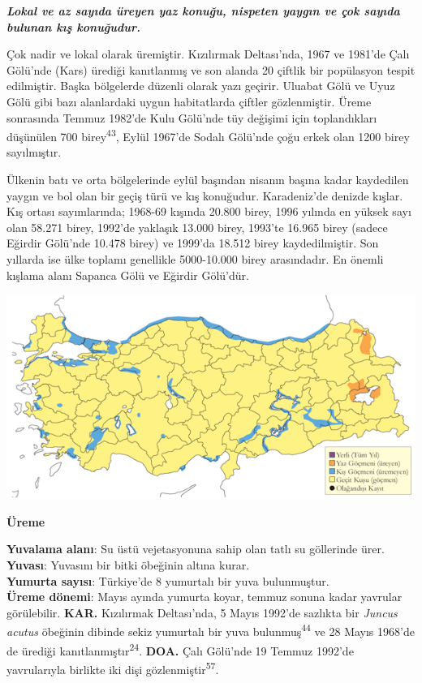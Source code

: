 \documentclass[
  letterpaper,
  DIV=11,
  numbers=noendperiod]{scrreprt}
\begin{document}
\textbf{\emph{Lokal ve az sayıda üreyen yaz konuğu, nispeten yaygın ve
çok sayıda bulunan kış konuğudur.}}

Çok nadir ve lokal olarak üremiştir. Kızılırmak Deltası'nda, 1967 ve
1981'de Çalı Gölü'nde (Kars) ürediği kanıtlanmış ve son alanda 20
çiftlik bir popülasyon tespit edilmiştir. Başka bölgelerde düzenli
olarak yazı geçirir. Uluabat Gölü ve Uyuz Gölü gibi bazı alanlardaki
uygun habitatlarda çiftler gözlenmiştir. Üreme sonrasında Temmuz 1982'de
Kulu Gölü'nde tüy değişimi için toplandıkları düşünülen 700
birey\textsuperscript{43}, Eylül 1967'de Sodalı Gölü'nde çoğu erkek olan
1200 birey sayılmıştır.

Ülkenin batı ve orta bölgelerinde eylül başından nisanın başına kadar
kaydedilen yaygın ve bol olan bir geçiş türü ve kış konuğudur.
Karadeniz'de denizde kışlar. Kış ortası sayımlarında; 1968-69 kışında
20.800 birey, 1996 yılında en yüksek sayı olan 58.271 birey, 1992'de
yaklaşık 13.000 birey, 1993'te 16.965 birey (sadece Eğirdir Gölü'nde
10.478 birey) ve 1999'da 18.512 birey kaydedilmiştir. Son yıllarda ise
ülke toplamı genellikle 5000-10.000 birey arasındadır. En önemli kışlama
alanı Sapanca Gölü ve Eğirdir Gölü'dür.

\includegraphics{images/harita_Page_025.png}

\textbf{Üreme}

\textbf{Yuvalama alanı}: Su üstü vejetasyonuna sahip olan tatlı su
göllerinde ürer.\\
\textbf{Yuvası}: Yuvasını bir bitki öbeğinin altına kurar.\\
\textbf{Yumurta sayısı}: Türkiye'de 8 yumurtalı bir yuva bulunmuştur.\\
\textbf{Üreme dönemi}: Mayıs ayında yumurta koyar, temmuz sonuna kadar
yavrular görülebilir. \textbf{KAR.} Kızılırmak Deltası'nda, 5 Mayıs
1992'de sazlıkta bir \emph{Juncus acutus} öbeğinin dibinde sekiz
yumurtalı bir yuva bulunmuş\textsuperscript{44} ve 28 Mayıs 1968'de de
ürediği kanıtlanmıştır\textsuperscript{24}. \textbf{DOA.} Çalı Gölü'nde
19 Temmuz 1992'de yavrularıyla birlikte iki dişi
gözlenmiştir\textsuperscript{57}.
\end{document}
